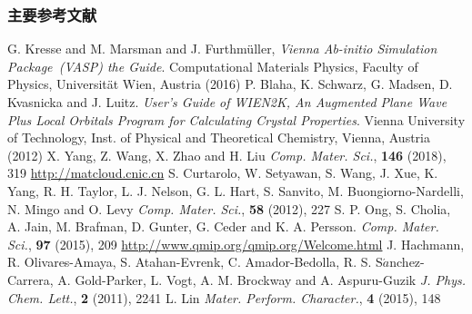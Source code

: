 {
\frametitle{主要参考文献}
\begin{thebibliography}{99}
{\tiny
	\textrm{G. Kresse and M. Marsman and J. Furthm\"uller, \textit{Vienna Ab-initio Simulation Package~\textrm{(VASP)} the Guide}. Computational Materials Physics, Faculty of Physics, Universit\"at Wien, Austria (2016)}
	\textrm{P. Blaha, K. Schwarz, G. Madsen, D. Kvasnicka and J. Luitz. \textit{User's Guide of WIEN2K, An Augmented Plane Wave Plus Local Orbitals Program for Calculating Crystal Properties}. Vienna University of Technology, Inst. of Physical and Theoretical Chemistry, Vienna, Austria (2012)}
	\textrm{X. Yang, Z. Wang, X. Zhao and H. Liu \textit{Comp. Mater. Sci.}, \textbf{146} (2018), 319}
	\textrm{\url{http://matcloud.cnic.cn}}
	\textrm{S. Curtarolo, W. Setyawan, S. Wang, J. Xue, K. Yang, R. H. Taylor, L. J. Nelson, G. L. Hart, S. Sanvito, M. Buongiorno-Nardelli, N. Mingo and O. Levy \textit{Comp. Mater. Sci.}, \textbf{58} (2012), 227}
	\textrm{S. P. Ong, S. Cholia, A. Jain, M. Brafman, D. Gunter, G. Ceder and K. A. Persson. \textit{Comp. Mater. Sci.}, \textbf{97} (2015), 209}
	\textrm{\url{http://www.qmip.org/qmip.org/Welcome.html}}
	\textrm{J. Hachmann, R. Olivares-Amaya, S. Atahan-Evrenk, C. Amador-Bedolla, R. S. S$\acute{a}$nchez-Carrera, A. Gold-Parker, L. Vogt, A. M. Brockway and A. Aspuru-Guzik \textit{J. Phys. Chem. Lett.}, \textbf{2} (2011), 2241}
	\textrm{L. Lin \textit{Mater. Perform. Character.}, \textbf{4} (2015), 148}
}
\end{thebibliography}
}
